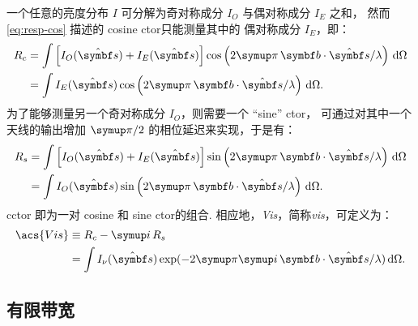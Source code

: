 一个任意的亮度分布 $I$ 可分解为奇对称成分 $I_O$ 与偶对称成分 $I_E$ 之和，
然而\autoref{eq:resp-cos} 描述的 cosine \ac{ctor}只能测量其中的
偶对称成分 $I_E$，即：
\begin{align}
  R_c & = \int \left[ I_O(\hat{\B{s}}) + I_E(\hat{\B{s}}) \right]
      \cos \left( 2\Cpi\, \B{b}\cdot\hat{\B{s}} / \lambda \right)
      \,\D{\Omega}  \\
    & = \int I_E(\hat{\B{s}}) \cos \left(
      2\Cpi\, \B{b}\cdot\hat{\B{s}} / \lambda \right) \,\D{\Omega}.
\end{align}
为了能够测量另一个奇对称成分 $I_O$，则需要一个 \enquote{sine} \ac{ctor}，
可通过对其中一个天线的输出增加 $\Cpi/2$ 的相位延迟来实现，于是有：
\begin{align}
  R_s & = \int \left[ I_O(\hat{\B{s}}) + I_E(\hat{\B{s}}) \right]
      \sin \left( 2\Cpi\, \B{b}\cdot\hat{\B{s}} / \lambda \right)
      \,\D{\Omega}  \\
    & = \int I_O(\hat{\B{s}}) \sin \left(
      2\Cpi\, \B{b}\cdot\hat{\B{s}} / \lambda \right) \,\D{\Omega}.
\end{align}
\ac{cctor} 即为一对 cosine 和 sine \ac{ctor}的组合.
相应地，\emph{\acf{Vis}}，简称\emph{\ac{vis}}，可定义为：
\begin{align}
  \label{eq:vis}
  \acs{Vis}
    & \equiv R_c - \Ci\, R_s  \\
    & = \int I_{\nu}(\hat{\B{s}}) \exp
      (-2\Cpi\Ci\, \B{b}\cdot\hat{\B{s}} / \lambda) \,\D{\Omega}.
\end{align}

\subsection{有限带宽}

